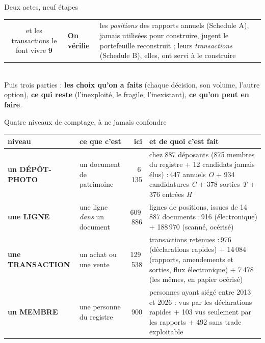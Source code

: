 \documentclass[11pt,aspectratio=169]{beamer}
\newcommand{\etape}[3]{%
  {\color{helec}\bfseries #1}\; & \textbf{#2} & {\scriptsize\color{black!60} #3}\\[0.6mm]}
\begin{document}
\begin{frame}{Deux actes, neuf étapes}
\begin{tabular}{@{}c@{\hspace{2.5mm}}l@{\hspace{3mm}}l@{}}
{{      et les transactions le font vivre}}
    \etape{9}{On vérifie}{\parbox[t]{0.72\textwidth}{\raggedright les \emph{positions} des rapports
      annuels (Schedule A), jamais utilisées pour construire, jugent le portefeuille reconstruit ;
      leurs \emph{transactions} (Schedule B), elles, ont servi à le construire}}
  \end{tabular}\\[0.2mm]
  {\scriptsize\color{black!60} Puis trois parties : \textbf{les choix qu'on a faits} (chaque
  décision, son volume, l'autre option), \textbf{ce qui reste} (l'inexploité, le fragile,
  l'inexistant), \textbf{ce qu'on peut en faire}.}
\end{frame}

\begin{frame}{Quatre niveaux de comptage, à ne jamais confondre}
  \centering\scriptsize
  \begin{tabular}{@{}l l r >{\raggedright\arraybackslash}p{6.8cm}@{}}
    \toprule
    \textbf{niveau} & \textbf{ce que c'est} & \textbf{ici} & \textbf{et de quoi c'est fait}\\
    \midrule
    \textcolor{helec}{\textbf{un DÉPÔT-PHOTO}} & un document de patrimoine & 6\,135 &
      chez 887 déposants (875 membres du registre + 12 candidats jamais élus) :\newline
      4\,447 annuels \emph{O} + 934 candidatures \emph{C}
      + 378 sorties \emph{T} + 376 entrées \emph{H}\\[1.1mm]
    \textcolor{dataC}{\textbf{une LIGNE}} & une ligne \emph{dans} un document & 609\,886 &
      lignes de positions, issues de 14\,887 documents :\newline
      420\,916 (électronique) + 188\,970 (scanné, océrisé)\\[1.1mm]
    \textcolor{okgreen}{\textbf{une TRANSACTION}} & un achat ou une vente & 129\,538 &
      transactions retenues :\newline 107\,976 (déclarations rapides)
      + 14\,084 (rapports, amendements et sorties, flux électronique)
      + 7\,478 (les mêmes, en papier océrisé)\\[1.1mm]
    \textcolor{alertred}{\textbf{un MEMBRE}} & une personne du registre & 900 &
      personnes ayant siégé entre 2013 et 2026 :\newline 305 vus par les déclarations rapides
      + 103 vus seulement par les rapports + 492 sans trade exploitable\\

\end{tabular}
\end{frame}
\end{document}
